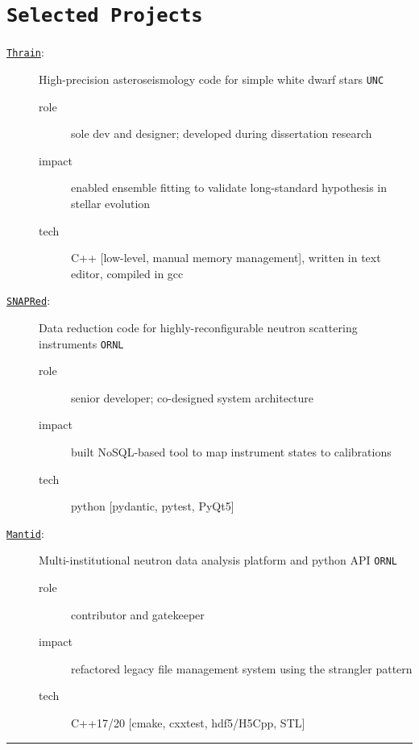 \documentclass[11pt, letter]{article}
\begin{document}
\section*{\tt Selected Projects}
\begin{minipage}{\textwidth}
  \begin{description}		
    \item[\href{https://github.com/rboston628/thrain}{\tt Thrain}:]
    High-precision asteroseismology code for simple white dwarf stars \hfill {\tt UNC}
	\vspace{-0.5\baselineskip}
    \begin{description}
      \item[role] sole dev and designer; developed during dissertation research
      \item[impact] enabled ensemble fitting to validate long-standard hypothesis in stellar evolution
      \item[tech] C++ [low-level, manual memory management], written in text editor, compiled in gcc
    \end{description}
    \item[\href{https://github.com/neutrons/SNAPRed}{\tt SNAPRed}:]
    Data reduction code for highly-reconfigurable neutron scattering instruments \hfill {\tt ORNL}
    \vspace{-0.5\baselineskip}
    \begin{description}
      \item[role] senior developer; co-designed system architecture
      \item[impact] built NoSQL-based tool to map instrument states to calibrations
      \item[tech] python [pydantic, pytest, PyQt5]
    \end{description}
    \item[\href{https://github.com/mantidproject/mantid}{\tt Mantid}:]
    Multi-institutional neutron data analysis platform and python API \hfill {\tt ORNL}
    \vspace{-0.5\baselineskip}
    \begin{description}
      \item[role] contributor and gatekeeper
      \item[impact] refactored legacy file management system using the strangler pattern
      \item[tech] C++17/20 [cmake, cxxtest, hdf5/H5Cpp, STL]
    \end{description}
  \end{description}
\hrule
\end{minipage}
\end{document}

